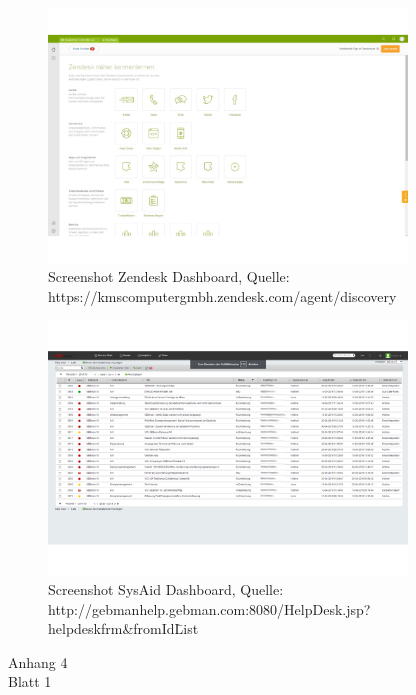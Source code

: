 \begin{figure}[h!]
\includegraphics[width=0.85\textwidth]{Abbildungen/Zendesk.pdf}
\caption*{Screenshot Zendesk Dashboard, \newline
Quelle: https://kmscomputergmbh.zendesk.com/agent/discovery}
\label{Zendesk}
\end{figure}

\begin{figure}[h!]
\includegraphics[width=0.85\textwidth]{Abbildungen/SysAid.pdf}
\caption*{Screenshot SysAid Dashboard, \newline
Quelle: http://gebmanhelp.gebman.com:8080/HelpDesk.jsp?helpdeskfrm\&fromId\=List}
\label{SysAid}
\end{figure}

\newpage


\begin{flushright}
Anhang 4\\
Blatt 1\\
\label{Anhang4}
\end{flushright}


